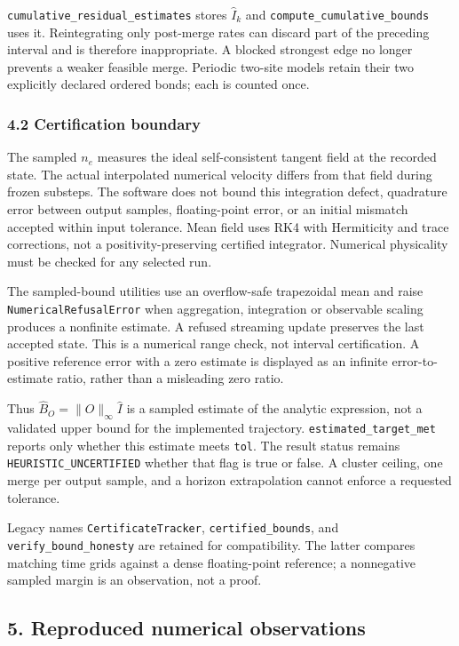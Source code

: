 \documentclass[
]{article}
\begin{document}
\texttt{cumulative\_residual\_estimates} stores \(\widehat I_k\) and
\texttt{compute\_cumulative\_bounds} uses it. Reintegrating only post-merge rates can discard part of the preceding interval and is therefore inappropriate. A blocked strongest edge no longer prevents a weaker feasible merge. Periodic two-site models retain their two explicitly declared ordered bonds; each is counted once.

\subsubsection{4.2 Certification boundary}\label{certification-boundary}

The sampled \(n_e\) measures the ideal self-consistent tangent field at the recorded state. The actual interpolated numerical velocity differs from that field during frozen substeps. The software does not bound this integration defect, quadrature error between output samples, floating-point error, or an initial mismatch accepted within input tolerance. Mean field uses RK4 with Hermiticity and trace corrections, not a positivity-preserving certified integrator. Numerical physicality must be checked for any selected run.

The sampled-bound utilities use an overflow-safe trapezoidal mean and raise
\texttt{NumericalRefusalError} when aggregation, integration or observable scaling
produces a nonfinite estimate. A refused streaming update preserves the last
accepted state. This is a numerical range check, not interval certification.
A positive reference error with a zero estimate is displayed as an infinite
error-to-estimate ratio, rather than a misleading zero ratio.

Thus \(\widehat B_O=\|O\|_\infty\widehat I\) is a sampled estimate of the analytic expression, not a validated upper bound for the implemented trajectory. \texttt{estimated\_target\_met} reports only whether this estimate meets \texttt{tol}. The result status remains \texttt{HEURISTIC\_UNCERTIFIED} whether that flag is true or false. A cluster ceiling, one merge per output sample, and a horizon extrapolation cannot enforce a requested tolerance.

Legacy names \texttt{CertificateTracker}, \texttt{certified\_bounds}, and
\texttt{verify\_bound\_honesty} are retained for compatibility. The latter compares matching time grids against a dense floating-point reference; a nonnegative sampled margin is an observation, not a proof.

\subsection{5. Reproduced numerical observations}\label{reproduced-numerical-observations}
\end{document}
